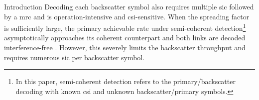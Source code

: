 \documentclass[journal]{IEEEtran}
\begin{document}
\begin{section}{Introduction}
	Decoding each backscatter symbol also requires multiple \gls{sic} followed by a \gls{mrc} and is operation-intensive and \gls{csi}-sensitive.
	When the spreading factor is sufficiently large, the primary achievable rate under semi-coherent detection\footnote{In this paper, semi-coherent detection refers to the primary/backscatter decoding with known \gls{csi} and unknown backscatter/primary symbols.} asymptotically approaches its coherent counterpart and both links are decoded interference-free \cite{Long2020a}.
	However, this severely limits the backscatter throughput and requires numerous \gls{sic} per backscatter symbol.




\end{section}
\end{document}
